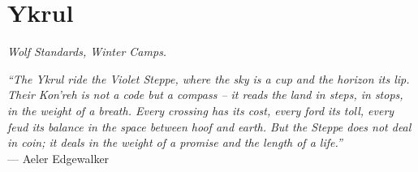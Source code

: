 \documentclass[12pt,oneside]{book}
\begin{document}


\newpage

\chapter{Ykrul}
\emph{Wolf Standards, Winter Camps.}

\noindent
\textit{``The Ykrul ride the Violet Steppe, where the sky is a cup and the horizon its lip. Their Kon'reh is not a code but a compass -- it reads the land in steps, in stops, in the weight of a breath. Every crossing has its cost, every ford its toll, every feud its balance in the space between hoof and earth. But the Steppe does not deal in coin; it deals in the weight of a promise and the length of a life.''} \\
--- Aeler Edgewalker
\end{document}
